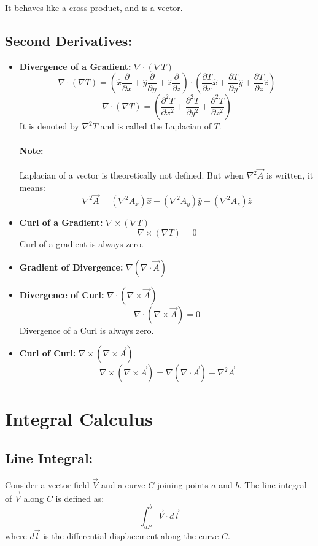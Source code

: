 \documentclass{article}
\begin{document}
It behaves like a cross product, and is a vector.

\subsection{Second Derivatives: }
\begin{itemize}
    \item \textbf{Divergence of a Gradient: } $\nabla \cdot \left(\nabla T\right)$
    \[ \nabla \cdot \left(\nabla T\right)  = \left(\hat{x} \frac{\partial}{\partial x} + \hat{y} \frac{\partial}{\partial y} + \hat{z} \frac{\partial}{\partial z}\right) \cdot \left(\frac{\partial T}{\partial x} \hat{x} + \frac{\partial T}{\partial y} \hat{y} + \frac{\partial T}{\partial z} \hat{z}\right)\]
    \[ \nabla \cdot \left(\nabla T\right)  = \left(\frac{\partial^2 T}{\partial x^2} + \frac{\partial^2 T}{\partial y^2} + \frac{\partial^2 T}{\partial z^2}\right)\]
    It is denoted by $\nabla^2 T$ and is called the Laplacian of $T$.
    \paragraph*{Note:} Laplacian of a vector is theoretically not defined. But when $\nabla^2 \vec{A}$ is written, it means:
    \[\nabla^2 \vec{A} = \left(\nabla^2 A_x\right) \hat{x} + \left(\nabla^2 A_y\right) \hat{y} + \left(\nabla^2 A_z\right) \hat{z}\]
    \item \textbf{Curl of a Gradient: } $\nabla \times \left(\nabla T\right)$ 
    \[\nabla \times \left(\nabla T\right) = 0\]
    Curl of a gradient is always zero.
    \item \textbf{Gradient of Divergence: } $\nabla \left(\nabla \cdot \vec{A}\right)$
    \item \textbf{Divergence of Curl: } $\nabla \cdot \left(\nabla \times \vec{A}\right)$
    \[\nabla \cdot \left(\nabla \times \vec{A}\right) = 0\]
    Divergence of a Curl is always zero.
    \item \textbf{Curl of Curl: } $\nabla \times \left(\nabla \times \vec{A}\right)$
    \[\nabla \times \left(\nabla \times \vec{A}\right) = \nabla \left(\nabla \cdot \vec{A}\right) - \nabla^2 \vec{A}\]
\end{itemize}

\section{Integral Calculus}

\subsection{Line Integral: }
Consider a vector field $\vec{V}$ and a curve $C$ joining points $a$ and $b$. The line integral of $\vec{V}$ along $C$ is defined as:
\[\int_{aP}^{b} \vec{V} \cdot d\vec{l}\]
where $d\vec{l}$ is the differential displacement along the curve $C$.
\end{document}
